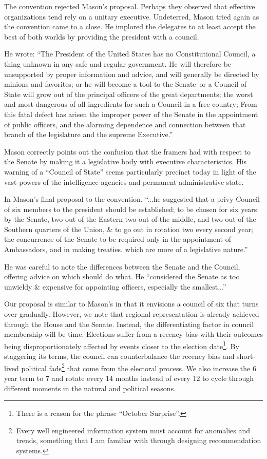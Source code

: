 \documentclass{article}
\newcommand{\quotes}[1]{``#1''}
\begin{document}
The convention rejected Mason's proposal. Perhaps they observed that effective organizations tend rely on a unitary executive. Undeterred, Mason tried again as the convention came to a close. He implored the delegates to at least accept the best of both worlds by providing the president with a council.

He wrote: \quotes{The President of the United States has no Constitutional Council, a thing unknown in any safe and regular government. He will therefore be unsupported by proper information and advice, and will generally be directed by minions and favorites; or he will become a tool to the Senate--or a Council of State will grow out of the principal officers of the great departments; the worst and most dangerous of all ingredients for such a Council in a free country; From this fatal defect has arisen the improper power of the Senate in the appointment of public officers, and the alarming dependence and connection between that branch of the legislature and the supreme Executive.}\cite{Mason_Objection}

Mason correctly points out the confusion that the framers had with respect to the Senate by making it a legislative body with executive characteristics. His warning of a \quotes{Council of State} seems particularly precinct today in light of the vast powers of the intelligence agencies and permanent administrative state.\cite{Cooper}

In Mason's final proposal to the convention, \quotes{...he suggested that a privy Council of six members to the president should be established; to be chosen for six years by the Senate, two out of the Eastern two out of the middle, and two out of the Southern quarters of the Union, \& to go out in rotation two every second year; the concurrence of the Senate to be required only in the appointment of Ambassadors, and in making treaties. which are more of a legislative nature.}\cite{Madison}

He was careful to note the differences between the Senate and the Council, offering advice on which should do what. He \quotes{considered the Senate as too unwieldy \& expensive for appointing officers, especially the smallest...}

Our proposal is similar to Mason's in that it envisions a council of six that turns over gradually. However, we note that regional representation is already achieved through the House and the Senate. Instead, the differentiating factor in council membership will be time. Elections suffer from a recency bias with their outcomes being disproportionately affected by events closer to the election date\footnote{There is a reason for the phrase \quotes{October Surprise}.}. By staggering its terms, the council can counterbalance the recency bias and short-lived political fads\footnote{Every well engineered information system must account for anomalies and trends, something that I am familiar with through designing recommendation systems.\cite{Yang}} that come from the electoral process. We also increase the 6 year term to 7 and rotate every 14 months instead of every 12 to cycle through different moments in the natural and political seasons.
\end{document}
